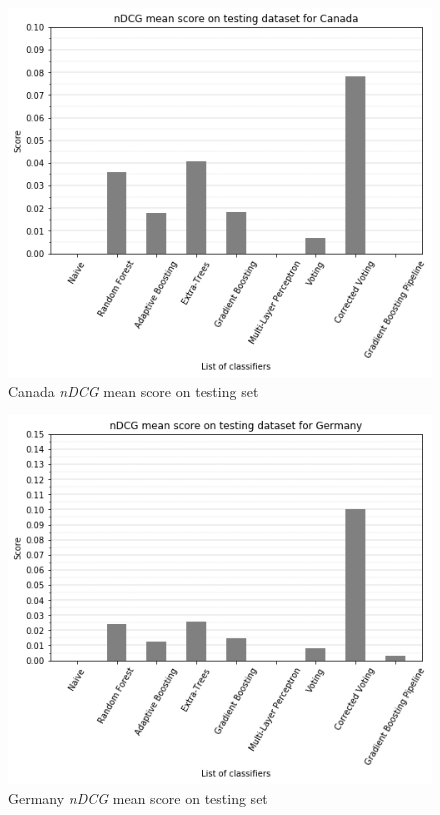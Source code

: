 \documentclass[twocolumn, switch]{article}
\begin{document}
\begin{figure}[H]
\centering
\includegraphics[scale=0.35]{../graphs/ndcg_mean_score_ca_test}
\caption{Canada \textit{nDCG} mean score on testing set}
\label{fig:ndcgtestca}
\end{figure}

\begin{figure}[H]
\centering
\includegraphics[scale=0.35]{../graphs/ndcg_mean_score_de_test}
\caption{Germany \textit{nDCG} mean score on testing set}
\label{fig:ndcgtestde}
\end{figure}
\end{document}
